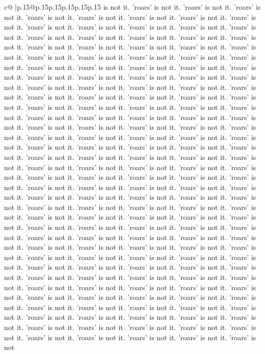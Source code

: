 \documentclass{article}
\begin{document}
{\begin{supertabular}{c@{$\;$}|p{.15\linewidth}@{}p{.15\linewidth}p{.15\linewidth}p{.15\linewidth}p{.15\linewidth}p{.15\linewidth}}
{{{is not it. 'roars' is not it. 'roars' is not it. 'roars' is not it. 'roars' is not it. 'roars' is not it. 'roars' is not it. 'roars' is not it. 'roars' is not it. 'roars' is not it. 'roars' is not it. 'roars' is not it. 'roars' is not it. 'roars' is not it. 'roars' is not it. 'roars' is not it. 'roars' is not it. 'roars' is not it. 'roars' is not it. 'roars' is not it. 'roars' is not it. 'roars' is not it. 'roars' is not it. 'roars' is not it. 'roars' is not it. 'roars' is not it. 'roars' is not it. 'roars' is not it. 'roars' is not it. 'roars' is not it. 'roars' is not it. 'roars' is not it. 'roars' is not it. 'roars' is not it. 'roars' is not it. 'roars' is not it. 'roars' is not it. 'roars' is not it. 'roars' is not it. 'roars' is not it. 'roars' is not it. 'roars' is not it. 'roars' is not it. 'roars' is not it. 'roars' is not it. 'roars' is not it. 'roars' is not it. 'roars' is not it. 'roars' is not it. 'roars' is not it. 'roars' is not it. 'roars' is not it. 'roars' is not it. 'roars' is not it. 'roars' is not it. 'roars' is not it. 'roars' is not it. 'roars' is not it. 'roars' is not it. 'roars' is not it. 'roars' is not it. 'roars' is not it. 'roars' is not it. 'roars' is not it. 'roars' is not it. 'roars' is not it. 'roars' is not it. 'roars' is not it. 'roars' is not it. 'roars' is not it. 'roars' is not it. 'roars' is not it. 'roars' is not it. 'roars' is not it. 'roars' is not it. 'roars' is not it. 'roars' is not it. 'roars' is not it. 'roars' is not it. 'roars' is not it. 'roars' is not it. 'roars' is not it. 'roars' is not it. 'roars' is not it. 'roars' is not it. 'roars' is not it. 'roars' is not it. 'roars' is not it. 'roars' is not it. 'roars' is not it. 'roars' is not it. 'roars' is not it. 'roars' is not it. 'roars' is not it. 'roars' is not it. 'roars' is not it. 'roars' is not it. 'roars' is not it. 'roars' is not it. 'roars' is not it. 'roars' is not it. 'roars' is not it. 'roars' is not it. 'roars' is not it. 'roars' is not it. 'roars' is not it. 'roars' is not it. 'roars' is not it. 'roars' is not it. 'roars' is not it. 'roars' is not it. 'roars' is not it. 'roars' is not it. 'roars' is not it. 'roars' is not it. 'roars' is not it. 'roars' is not it. 'roars' is not it. 'roars' is not it. 'roars' is not it. 'roars' is not it. 'roars' is not it. 'roars' is not it. 'roars' is not it. 'roars' is not it. 'roars' is not it. 'roars' is not it. 'roars' is not it. 'roars' is not it. 'roars' is not it. 'roars' is not it. 'roars' is not it. 'roars' is not it. 'roars' is not it. 'roars' is not it. 'roars' is not it. 'roars' is not it. 'roars' is not it. 'roars' is not it. 'roars' is not it. 'roars' is not it. 'roars' is not it. 'roars' is not it. 'roars' is not it. 'roars' is not it. 'roars' is not it. 'roars' is not it. 'roars' is not it. 'roars' is not it. 'roars' is not it. 'roars' is not it. 'roars' is not it. 'roars' is not it. 'roars' is not it. 'roars' is not it. 'roars' is not it. 'roars' is not it. 'roars' is not it. 'roars' is not it. 'roars' is not it. 'roars' is not it. 'roars' is not it. 'roars' is not it. 'roars' is not it. 'roars' is not it. 'roars' is not it. 'roars' is not it. 'roars' is not it. 'roars' is not }}}
\end{supertabular}}
\end{document}

